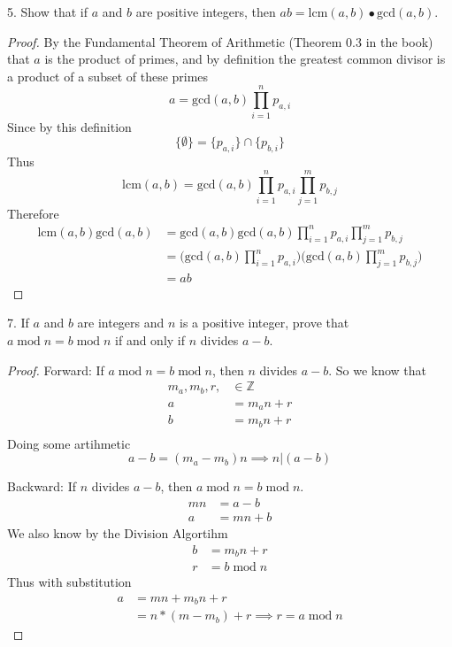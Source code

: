 5. Show that if $a$ and $b$ are positive integers, then $ab = \text{lcm}(a,b) \bullet \text{gcd}(a,b)$.

\begin{proof}
By the Fundamental Theorem of Arithmetic (Theorem 0.3 in the book) that $a$ is the product of primes, and by definition the greatest common divisor is a product of a subset of these primes
\[ a = \text{gcd}(a,b)\prod_{i=1}^{n} p_{a,i}\]
Since by this definition
\[\{\emptyset\} = \{p_{a,i}\} \cap \{p_{b,i}\}  \]
Thus 
\[\text{lcm}(a,b)= \text{gcd}(a,b)\prod_{i=1}^{n} p_{a,i} \prod_{j=1}^{m} p_{b,j}\]
Therefore
\begin{align}
\text{lcm}(a,b) \text{gcd}(a,b) &= \text{gcd}(a,b)\text{gcd}(a,b)\prod_{i=1}^{n} p_{a,i} \prod_{j=1}^{m} p_{b,j} \\
&= \big(\text{gcd}(a,b) \prod_{i=1}^{n} p_{a,i} \big)\big( \text{gcd}(a,b)\prod_{j=1}^{m} p_{b,j}\big) \\
&= ab
\end{align}
\end{proof}

7. If $a$ and $b$ are integers and $n$ is a positive integer, prove that $ a \;\mathrm{mod}\; n = b \;\mathrm{mod}\; n$ if and only if $n$ divides $a-b$.

\begin{proof}
Forward: If $ a \;\mathrm{mod}\; n = b \;\mathrm{mod}\; n$, then $n$ divides $a-b$. 
So we know that
\begin{align}
m_a, m_b, r, &\in \mathbb{Z} \\
a &= m_an + r \\
b &= m_bn + r \\
\end{align}
Doing some artihmetic
\[ a - b = (m_a - m_b)n \implies n | (a - b)\]

Backward: If $n$ divides $a-b$, then $ a \;\mathrm{mod}\; n = b \;\mathrm{mod}\; n$.
\begin{align}
mn &= a - b \\
a &= mn +b 
\end{align}
We also know by the Division Algortihm
\begin{align*}
b &= m_bn + r \\
r &= b\;\mathrm{mod}\; n
\end{align*}
Thus with substitution
\begin{align}
a &= mn + m_bn + r \\
&= n*(m - m_b) +r \implies r = a\;\mathrm{mod}\; n
\end{align}
\end{proof}